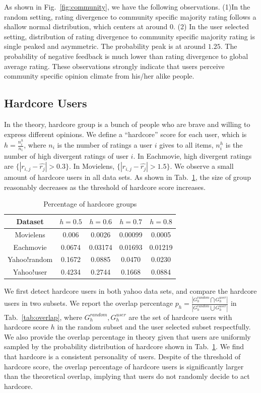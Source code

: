 \documentclass{sig-alternate}
\begin{document}
As shown in Fig.~\ref{fig:community}, we have the following observations. (1)In the random setting, rating divergence to community specific majority rating follows a shallow normal distribution, which centers at around $0$.  (2) In the user selected setting, distribution of rating divergence to community specific majority rating is single peaked and asymmetric. The probability peak is at around $1.25$. The probability of negative feedback is much lower than rating divergence to global average rating. These observations strongly indicate that users perceive community specific opinion climate from his/her alike people.

\subsection{Hardcore Users}

In the theory, hardcore group is a bunch of people who are brave and willing to express different opinions. We define a ``hardcore'' score for each user, which is $h=\frac{n^h_i}{n_i}$, where $n_i$ is the number of ratings a user $i$ gives to all items, $n^h_i$ is the number of high divergent ratings of user $i$. In Eachmovie, high divergent ratings are $\{|r_{i,j}-\hat{r_{j}}|>0.3\}$. In Movielens, $\{|r_{i,j}-\hat{r_{j}}|>1.5\}$.   We observe a small amount of hardcore users in all data sets. As shown in Tab.~\ref{tab:hardcore}, the size of group reasonably decreases as the threshold of hardcore score increases.

\begin{table}[htbp]
\centering
\caption{Percentage of hardcore groups}\label{tab:hardcore}
\centering
\begin{tabular}{|c|c|c|c|c|}
\hline
Dataset & $h=0.5$ & $h=0.6$ & $h=0.7$ & $h=0.8$ \\\hline\hline
Movielens & 0.006	 & 0.0026 &	0.00099 &	0.0005 \\\hline
Eachmovie & 0.0674 &	0.03174 &	0.01693 &	0.01219\\\hline
Yahoo!random & 0.1672& 0.0885& 0.0470& 0.0230\\\hline
Yahoo!user & 0.4234 &0.2744 & 0.1668 & 0.0884\\\hline
\end{tabular}
\end{table}

We first detect hardcore users in both yahoo data sets, and compare the hardcore users in two subsets. We report the overlap percentage $p_h=\frac{|G_{h}^{random}\bigcap G_{h}^{user}|}{|G_{h}^{random}\bigcup G_{h}^{user}|}$ in Tab.~\ref{tab:overlap}, where $G_{h}^{random},G_{h}^{user}$ are the set of hardcore users with hardcore score $h$ in the random subset and the user selected subset respectfully. We also provide the overlap percentage in theory given that users are uniformly sampled by the probability distribution of hardcore shown in Tab.~\ref{tab:hardcore}. We find that hardcore is a consistent personality of users. Despite of the threshold of hardcore score, the overlap percentage of hardcore users is significantly larger than the theoretical overlap, implying that users do not randomly decide to act hardcore.
\end{document}
